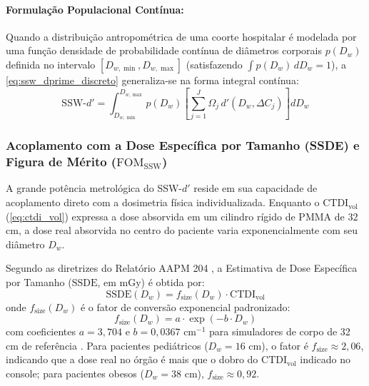 \documentclass[
  12pt,
  a4paper,
  oneside
]{report}
\begin{document}
\paragraph{Formulação Populacional Contínua:} Quando a distribuição antropométrica de uma coorte hospitalar é modelada por uma função densidade de probabilidade contínua de diâmetros corporais $p(D_w)$ definida no intervalo $[D_{w,\min}, D_{w,\max}]$ (satisfazendo $\int p(D_w) \, dD_w = 1$), a \cref{eq:ssw_dprime_discreto} generaliza-se na forma integral contínua:
\begin{equation}
  \text{SSW-}d' = \int_{D_{w,\min}}^{D_{w,\max}} p(D_w) \left[ \sum_{j=1}^J \Omega_j \, d'(D_w, \Delta C_j) \right] dD_w
  \label{eq:ssw_dprime_continuo}
\end{equation}

\subsubsection{Acoplamento com a Dose Específica por Tamanho (SSDE) e Figura de Mérito (\texorpdfstring{$\text{FOM}_{\text{SSW}}$}{FOM_SSW})}
A grande potência metrológica do SSW-$d'$ reside em sua capacidade de acoplamento direto com a dosimetria física individualizada. Enquanto o $\text{CTDI}_{\text{vol}}$ (\cref{eq:ctdi_vol}) expressa a dose absorvida em um cilindro rígido de PMMA de 32 cm, a dose real absorvida no centro do paciente varia exponencialmente com seu diâmetro $D_w$. 

Segundo as diretrizes do Relatório AAPM 204 \cite{aapm_report204}, a Estimativa de Dose Específica por Tamanho ($\text{SSDE}$, em mGy) é obtida por:
\begin{equation}
  \text{SSDE}(D_w) = f_{\text{size}}(D_w) \cdot \text{CTDI}_{\text{vol}}
  \label{eq:ssde_formula}
\end{equation}
onde $f_{\text{size}}(D_w)$ é o fator de conversão exponencial padronizado:
\begin{equation}
  f_{\text{size}}(D_w) = a \cdot \exp(-b \cdot D_w)
  \label{eq:fator_conversao_tamanho}
\end{equation}
com coeficientes $a = 3{,}704$ e $b = 0{,}0367\text{ cm}^{-1}$ para simuladores de corpo de 32 cm de referência \cite{aapm_report204}. Para pacientes pediátricos ($D_w = 16\text{ cm}$), o fator é $f_{\text{size}} \approx 2{,}06$, indicando que a dose real no órgão é mais que o dobro do $\text{CTDI}_{\text{vol}}$ indicado no console; para pacientes obesos ($D_w = 38\text{ cm}$), $f_{\text{size}} \approx 0{,}92$.
\end{document}
